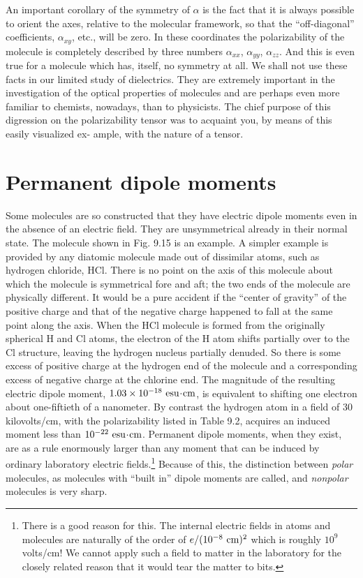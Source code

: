 An important corollary of the symmetry of $\alpha$ is the fact that it is
always possible to orient the axes, relative to the molecular 
framework, so that the ``off-diagonal'' coefficients, $\alpha_{xy}$, etc., will be zero.
In these coordinates the polarizability of the molecule is completely
described by three numbers $\alpha_{xx}$, $\alpha_{yy}$, $\alpha_{zz}$.
And this is even true for
a molecule which has, itself, no symmetry at all. We shall not use
these facts in our limited study of dielectrics. They are extremely
important in the investigation of the optical properties of molecules
and are perhaps even more familiar to chemists, nowadays, than to
physicists. The chief purpose of this digression on the polarizability
tensor was to acquaint you, by means of this easily visualized ex-
ample, with the nature of a tensor.

\section{Permanent dipole moments}

Some molecules are so constructed that they have electric dipole
moments even in the absence of an electric field. They are unsymmetrical
already in their normal state. The molecule shown in
Fig. 9.15 is an example. A simpler example is provided by any
diatomic molecule made out of dissimilar atoms, such as hydrogen
chloride, HCl. There is no point on the axis of this molecule about
which the molecule is symmetrical fore and aft; the two ends of the
molecule are physically different. It would be a pure accident if the
``center of gravity'' of the positive charge and that of the negative
charge happened to fall at the same point along the axis. When
the HCl molecule is formed from the originally spherical H and Cl
atoms, the electron of the H atom shifts partially over to the Cl 
structure, leaving the hydrogen nucleus partially denuded. So there is
some excess of positive charge at the hydrogen end of the molecule
and a corresponding excess of negative charge at the chlorine end.
The magnitude of the resulting electric dipole moment, 
$1.03\times10^{-18}\ \zu{esu}\unitdot\cmunit$, is
equivalent to shifting one electron about one-fiftieth of a nanometer.
By contrast the hydrogen atom in a field of 
30 kilovolts/cm, with the polarizability listed in Table 9.2, acquires an induced
moment less than $10^{-22}\ \textup{esu}\!\cdot\!\textup{cm}$. Permanent dipole moments,
when they exist, are as a rule enormously larger than any moment
that can be induced by ordinary laboratory electric 
fields.\footnote{
There is a good reason for this. The internal electric fields in atoms and molecules
are naturally of the order of $e/(10^{-8}\ \textup{cm})^2$ which is roughly $10^9$ volts/cm! We
cannot apply such a field to matter in the laboratory for the closely related reason that
it would tear the matter to bits.} Because
of this, the distinction between \emph{polar} molecules, as molecules with
``built in'' dipole moments are called, and \emph{nonpolar} molecules is very
sharp.

